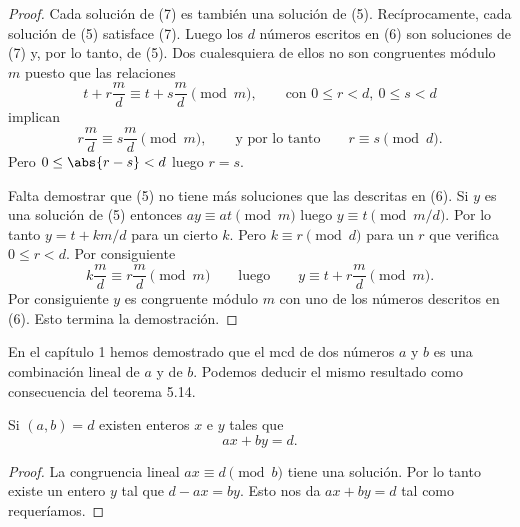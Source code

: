 \documentclass[12pt,a4paper]{book}
\begin{document}
    \begin{proof}
        Cada solución de (7) es también una solución de (5). Recíprocamente, cada solución
        de (5) satisface (7). Luego los $d$ números escritos en (6) son soluciones de (7)
        y, por lo tanto, de (5). Dos cualesquiera de ellos no son congruentes módulo $m$
        puesto que las relaciones
        \begin{equation*}
            t+r\frac{m}{d}\equiv t+s\frac{m}{d}\pmod{m},\qquad\text{con }0\leq r<d,\
            0\leq s<d
        \end{equation*}
        implican
        \begin{equation*}
            r\frac{m}{d}\equiv s\frac{m}{d}\pmod{m},\qquad\text{y por lo tanto}\qquad
            r\equiv s\pmod{d}.
        \end{equation*}
        Pero $0\leq\abs{r-s}<d$ luego $r=s$.

        Falta demostrar que (5) no tiene más soluciones que las descritas en (6). Si $y$
        es una solución de (5) entonces $ay\equiv at\pmod{m}$ luego
        $y\equiv t\pmod{m/d}$. Por lo tanto $y=t+km/d$ para un cierto $k$. Pero
        $k\equiv r\pmod{d}$ para un $r$ que verifica $0\leq r<d$. Por consiguiente
        \begin{equation*}
            k\frac{m}{d}\equiv r\frac{m}{d}\pmod{m}\qquad\text{luego}\qquad
            y\equiv t+r\frac{m}{d}\pmod{m}.
        \end{equation*}
        Por consiguiente $y$ es congruente módulo $m$ con uno de los números descritos en
        (6). Esto termina la demostración.
    \end{proof}

    En el capítulo 1 hemos demostrado que el mcd de dos números $a$ y $b$ es una
    combinación lineal de $a$ y de $b$. Podemos deducir el mismo resultado como
    consecuencia del teorema 5.14.

    \begin{teorema}
        Si $(a,b)=d$ existen enteros $x$ e $y$ tales que
        \begin{equation}
            ax+by=d.
        \end{equation}
    \end{teorema}

    \begin{proof}
        La congruencia lineal $ax\equiv d\pmod{b}$ tiene una solución. Por lo tanto existe
        un entero $y$ tal que $d-ax=by$. Esto nos da $ax+by=d$ tal como requeríamos.
    \end{proof}
\end{document}
